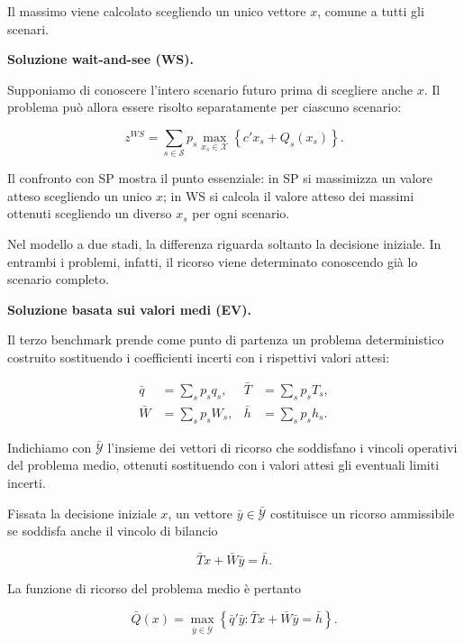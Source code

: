 Il massimo viene calcolato scegliendo un unico
vettore $x$, comune a tutti gli scenari.

\medskip

\noindent
\textbf{Soluzione wait-and-see (WS).}

Supponiamo di conoscere l'intero scenario
futuro prima di scegliere anche $x$.
Il problema pu\`o allora essere risolto
separatamente per ciascuno scenario:

\begin{equation}
z^{WS}
=
\sum_{s\in\mathcal S}p_s
\max_{x_s\in\mathcal X}
\left\{
c'x_s+Q_s(x_s)
\right\}.
\label{eq:cap15-ws-benchmark-v2}
\end{equation}

Il confronto con SP mostra il punto essenziale:
in SP si massimizza un valore atteso scegliendo
un unico $x$; in WS si calcola il valore atteso
dei massimi ottenuti scegliendo un diverso $x_s$
per ogni scenario.

Nel modello a due stadi, la differenza riguarda
soltanto la decisione iniziale. In entrambi
i problemi, infatti, il ricorso viene determinato
conoscendo gi\`a lo scenario completo.

\medskip

\noindent
\textbf{Soluzione basata sui valori medi (EV).}

Il terzo benchmark prende come punto di partenza
un problema deterministico costruito sostituendo
i coefficienti incerti con i rispettivi
valori attesi:

\[
\begin{aligned}
\bar q&=\sum_s p_s q_s,
&
\bar T&=\sum_s p_s T_s,
\\[4pt]
\bar W&=\sum_s p_s W_s,
&
\bar h&=\sum_s p_s h_s.
\end{aligned}
\]

Indichiamo con $\bar{\mathcal Y}$ l'insieme
dei vettori di ricorso che soddisfano
i vincoli operativi del problema medio,
ottenuti sostituendo con i valori attesi
gli eventuali limiti incerti.

Fissata la decisione iniziale $x$,
un vettore $\bar y\in\bar{\mathcal Y}$
costituisce un ricorso ammissibile
se soddisfa anche il vincolo di bilancio

\[
\bar T x+\bar W\bar y=\bar h.
\]

La funzione di ricorso del problema medio
\`e pertanto

\[
\bar Q(x)
=
\max_{\bar y\in\bar{\mathcal Y}}
\left\{
\bar q'\bar y:
\bar T x+\bar W\bar y=\bar h
\right\}.
\]

